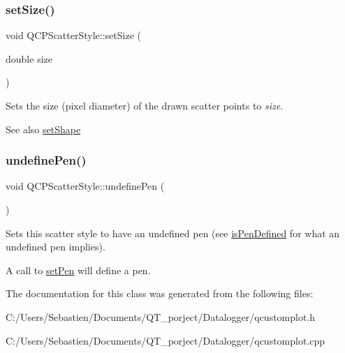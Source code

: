 \subsubsection{\texorpdfstring{set\+Size()}{setSize()}}
{\footnotesize\ttfamily void Q\+C\+P\+Scatter\+Style\+::set\+Size (\begin{DoxyParamCaption}\item[{double}]{size }\end{DoxyParamCaption})}

Sets the size (pixel diameter) of the drawn scatter points to {\itshape size}.

\begin{DoxySeeAlso}{See also}
\hyperlink{class_q_c_p_scatter_style_a7c641c4d4c6d29cb705d3887cfce91c1}{set\+Shape} 
\end{DoxySeeAlso}
\mbox{\label{class_q_c_p_scatter_style_acabc2a8c83d650b946f50c3166b6c35e}} 
\subsubsection{\texorpdfstring{undefine\+Pen()}{undefinePen()}}
{\footnotesize\ttfamily void Q\+C\+P\+Scatter\+Style\+::undefine\+Pen (\begin{DoxyParamCaption}{ }\end{DoxyParamCaption})}

Sets this scatter style to have an undefined pen (see \hyperlink{class_q_c_p_scatter_style_a47077eb6450fe9a788f833e4ec1b1d5a}{is\+Pen\+Defined} for what an undefined pen implies).

A call to \hyperlink{class_q_c_p_scatter_style_a761f1f229cc0ca4703e1e2b89f6dd1ba}{set\+Pen} will define a pen. 

The documentation for this class was generated from the following files\+:\begin{DoxyCompactItemize}
\item 
C\+:/\+Users/\+Sebastien/\+Documents/\+Q\+T\+\_\+porject/\+Datalogger/qcustomplot.\+h\item 
C\+:/\+Users/\+Sebastien/\+Documents/\+Q\+T\+\_\+porject/\+Datalogger/qcustomplot.\+cpp\end{DoxyCompactItemize}
